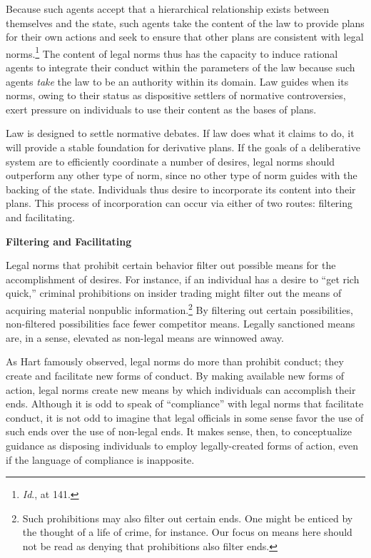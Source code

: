 Because such agents accept that a hierarchical relationship exists
between themselves and the state, such agents take the content of the
law to provide plans for their own actions and seek to ensure that other
plans are consistent with legal norms.\footnote{\emph{Id}., at 141.} The
content of legal norms thus has the capacity to induce rational agents
to integrate their conduct within the parameters of the law because such
agents \emph{take} the law to be an authority within its domain. Law
guides when its norms, owing to their status as dispositive settlers of
normative controversies, exert pressure on individuals to use their
content as the bases of plans.

Law is designed to settle normative debates. If law does what it claims
to do, it will provide a stable foundation for derivative plans. If the
goals of a deliberative system are to efficiently coordinate a number of
desires, legal norms should outperform any other type of norm, since no
other type of norm guides with the backing of the state. Individuals
thus desire to incorporate its content into their plans. This process of
incorporation can occur via either of two routes: filtering and
facilitating.

\textbf{Filtering and Facilitating}

Legal norms that prohibit certain behavior filter out possible means for
the accomplishment of desires. For instance, if an individual has a
desire to ``get rich quick,'' criminal prohibitions on insider trading
might filter out the means of acquiring material nonpublic
information.\footnote{Such prohibitions may also filter out certain
  ends. One might be enticed by the thought of a life of crime, for
  instance. Our focus on means here should not be read as denying that
  prohibitions also filter ends.} By filtering out certain
possibilities, non-filtered possibilities face fewer competitor means.
Legally sanctioned means are, in a sense, elevated as non-legal means
are winnowed away.

As Hart famously observed, legal norms do more than prohibit conduct;
they create and facilitate new forms of conduct. By making available new
forms of action, legal norms create new means by which individuals can
accomplish their ends. Although it is odd to speak of ``compliance''
with legal norms that facilitate conduct, it is not odd to imagine that
legal officials in some sense favor the use of such ends over the use of
non-legal ends. It makes sense, then, to conceptualize guidance as
disposing individuals to employ legally-created forms of action, even if
the language of compliance is inapposite.

